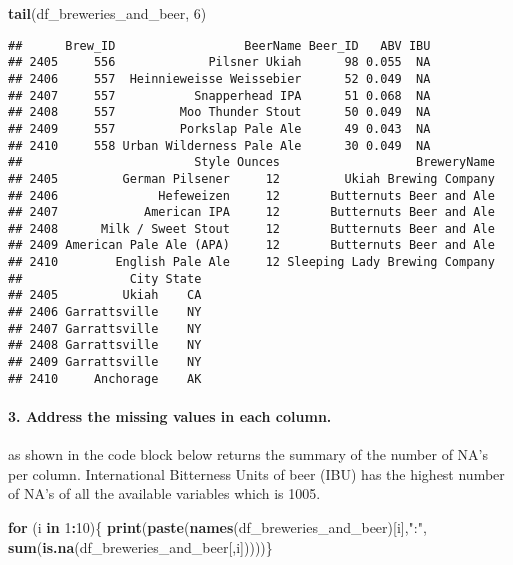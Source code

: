 \documentclass[]{article}
\newenvironment{Shaded}{\begin{snugshade}}{\end{snugshade}}
\newcommand{\ControlFlowTok}[1]{\textcolor[rgb]{0.13,0.29,0.53}{\textbf{#1}}}
\newcommand{\DecValTok}[1]{\textcolor[rgb]{0.00,0.00,0.81}{#1}}
\newcommand{\KeywordTok}[1]{\textcolor[rgb]{0.13,0.29,0.53}{\textbf{#1}}}
\newcommand{\NormalTok}[1]{#1}
\newcommand{\OperatorTok}[1]{\textcolor[rgb]{0.81,0.36,0.00}{\textbf{#1}}}
\newcommand{\StringTok}[1]{\textcolor[rgb]{0.31,0.60,0.02}{#1}}
\let\oldparagraph\paragraph
\renewcommand{\paragraph}[1]{\oldparagraph{#1}\mbox{}}
\begin{document}
\begin{Shaded}
\begin{Highlighting}[]
\KeywordTok{tail}\NormalTok{(df_breweries_and_beer, }\DecValTok{6}\NormalTok{)}
\end{Highlighting}
\end{Shaded}

\begin{verbatim}
##      Brew_ID                  BeerName Beer_ID   ABV IBU
## 2405     556             Pilsner Ukiah      98 0.055  NA
## 2406     557  Heinnieweisse Weissebier      52 0.049  NA
## 2407     557           Snapperhead IPA      51 0.068  NA
## 2408     557         Moo Thunder Stout      50 0.049  NA
## 2409     557         Porkslap Pale Ale      49 0.043  NA
## 2410     558 Urban Wilderness Pale Ale      30 0.049  NA
##                        Style Ounces                   BreweryName
## 2405         German Pilsener     12         Ukiah Brewing Company
## 2406              Hefeweizen     12       Butternuts Beer and Ale
## 2407            American IPA     12       Butternuts Beer and Ale
## 2408      Milk / Sweet Stout     12       Butternuts Beer and Ale
## 2409 American Pale Ale (APA)     12       Butternuts Beer and Ale
## 2410        English Pale Ale     12 Sleeping Lady Brewing Company
##               City State
## 2405         Ukiah    CA
## 2406 Garrattsville    NY
## 2407 Garrattsville    NY
## 2408 Garrattsville    NY
## 2409 Garrattsville    NY
## 2410     Anchorage    AK
\end{verbatim}

\hypertarget{address-the-missing-values-in-each-column.}{%
\paragraph{3. Address the missing values in each
column.}\label{address-the-missing-values-in-each-column.}}

as shown in the code block below returns the summary of the number of
NA's per column. International Bitterness Units of beer (IBU) has the
highest number of NA's of all the available variables which is 1005.

\begin{Shaded}
\begin{Highlighting}[]
\ControlFlowTok{for}\NormalTok{ (i }\ControlFlowTok{in} \DecValTok{1}\OperatorTok{:}\DecValTok{10}\NormalTok{)\{}
  \KeywordTok{print}\NormalTok{(}\KeywordTok{paste}\NormalTok{(}\KeywordTok{names}\NormalTok{(df_breweries_and_beer)[i],}\StringTok{":"}\NormalTok{, }\KeywordTok{sum}\NormalTok{(}\KeywordTok{is.na}\NormalTok{(df_breweries_and_beer[,i]))))\}}
\end{Highlighting}
\end{Shaded}
\end{document}
